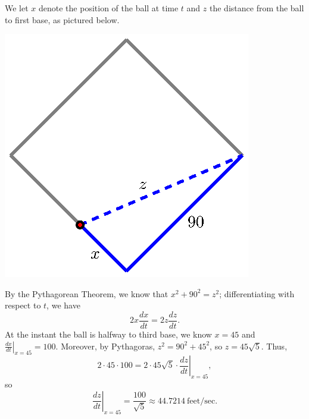 \begin{activitySolution}
We let $x$ denote the position of the ball at time $t$ and $z$ the distance from the ball to first base, as pictured below.
\begin{center}
\includegraphics{figures/3_5_Act4Soln1.eps}
\end{center}
By the Pythagorean Theorem, we know that $x^2 + 90^2 = z^2$; differentiating with respect to $t$, we have
$$2x\frac{dx}{dt} = 2z\frac{dz}{dt}.$$
At the instant the ball is halfway to third base, we know $x = 45$ and $\left. \frac{dx}{dt} \right|_{x = 45} = 100$.  Moreover, by Pythagoras, $z^2 = 90^2 + 45^2$, so $z = 45\sqrt{5}$.  Thus,
$$2 \cdot 45 \cdot 100 = 2 \cdot 45 \sqrt{5} \cdot \left. \frac{dz}{dt} \right|_{x = 45},$$
so 
$$\left. \frac{dz}{dt} \right|_{x = 45} = \frac{100}{\sqrt{5}} \approx 44.7214 \ \mbox{feet/sec}.$$


\end{activitySolution}
